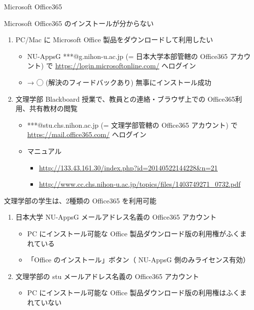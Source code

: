 \documentclass[a4j,10pt]{jsarticle}
\begin{document}
{\newpage\clearpage
{}%
\begin{frame}[label={sec:org712dbc5},fragile]{Microsoft Office365}
 \begin{block}{Microsoft Office365 のインストールが分からない}
\begin{enumerate}
\item PC/Mac に Microsoft Office 製品をダウンロードして利用したい
\begin{itemize}
\item NU-AppsG ***@g.nihon-u.ac.jp (= 日本大学本部管轄の Office365 アカウント) で \url{https://login.microsoftonline.com/} へログイン
\item → ◯ (解決のフィードバックあり) 無事にインストール成功
\end{itemize}
\par
\item 文理学部 Blackboard 授業で、教員との連絡・ブラウザ上での Office365利用、共有教材の閲覧
\begin{itemize}
\item ***@stu.chs.nihon.ac.jp (= 文理学部管轄の Office365 アカウント) で \url{https://mail.office365.com/} へログイン
\item マニュアル
\begin{itemize}
\item \url{http://133.43.161.30/index.php?id=20140522144228\&n=21}
\item \url{http://www.cc.chs.nihon-u.ac.jp/topics/files/1403749271\_0732.pdf}
\end{itemize}
\end{itemize}
\end{enumerate}
\par
文理学部の学生は、2種類の Office365 を利用可能
\par
\begin{enumerate}
\item 日本大学 NU-AppsG メールアドレス名義の Office365 アカウント
\begin{itemize}
\item PC にインストール可能な Office 製品ダウンロード版の利用権がふくまれている
\item 「Office のインストール」ボタン（ NU-AppsG 側のみライセンス有効）
\end{itemize}
\par
\item 文理学部の stu メールアドレス名義の Office365 アカウント
\begin{itemize}
\item PC にインストール可能な Office 製品ダウンロード版の利用権はふくまれていない

\end{itemize}
\end{enumerate}
\end{block}
\end{frame}}
\end{document}
